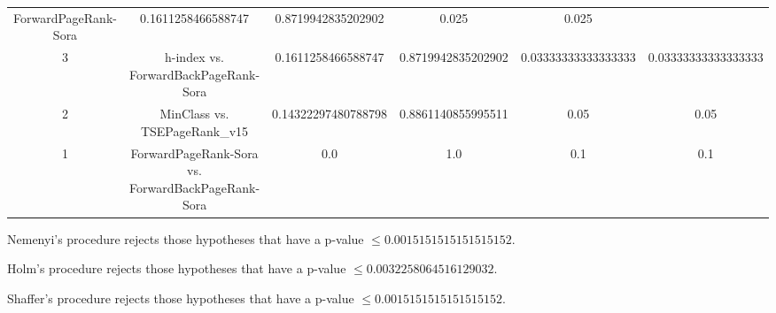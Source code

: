 \documentclass[a4paper,10pt]{article}
\begin{document}
\begin{landscape}
\begin{table}[!htp]
\begin{tabular}{cccccc}
ForwardPageRank-Sora&0.1611258466588747&0.8719942835202902&0.025&0.025\\3&h-index vs. ForwardBackPageRank-Sora&0.1611258466588747&0.8719942835202902&0.03333333333333333&0.03333333333333333\\2&MinClass vs. TSEPageRank_v15&0.14322297480788798&0.8861140855995511&0.05&0.05\\1&ForwardPageRank-Sora vs. ForwardBackPageRank-Sora&0.0&1.0&0.1&0.1\\\hline
\end{tabular}
\end{table}
Nemenyi's procedure rejects those hypotheses that have a p-value $\le0.0015151515151515152$.


Holm's procedure rejects those hypotheses that have a p-value $\le0.0032258064516129032$.


Shaffer's procedure rejects those hypotheses that have a p-value $\le0.0015151515151515152$.



\end{landscape}
\end{document}
